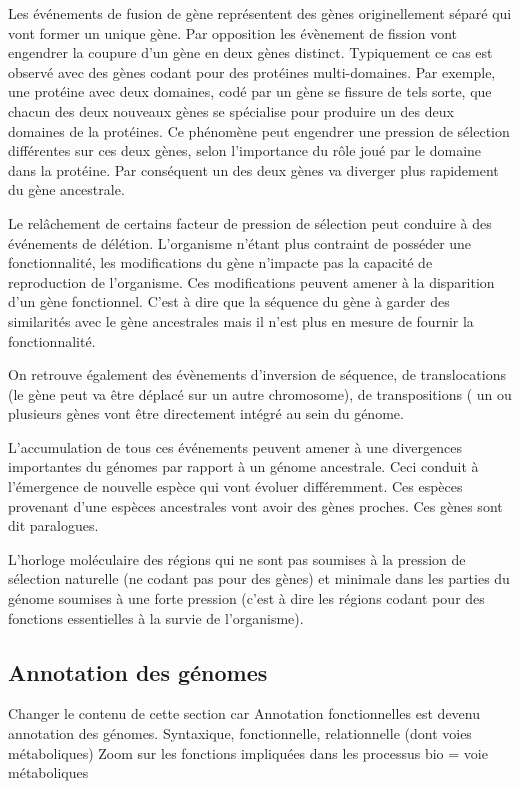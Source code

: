 \begin{refsection}
    Les événements de fusion de gène représentent des gènes originellement séparé qui vont former un unique gène. Par opposition les évènement de fission vont  engendrer la coupure d’un gène en deux gènes distinct. Typiquement ce cas est observé avec des gènes codant pour des protéines multi-domaines. Par exemple, une protéine avec deux domaines, codé par un gène se fissure de tels sorte, que chacun des deux nouveaux gènes se spécialise pour produire un des deux domaines de la protéines. Ce phénomène peut engendrer une pression de sélection différentes sur ces deux gènes, selon l’importance du rôle joué par le domaine dans la protéine. Par conséquent un des deux gènes va diverger plus rapidement du gène ancestrale.
    
    Le relâchement de certains facteur de pression de sélection peut conduire à des événements de délétion. L’organisme n’étant plus contraint de posséder une fonctionnalité, les modifications du gène n’impacte pas la capacité de reproduction de l’organisme. Ces modifications peuvent amener à la disparition d’un gène fonctionnel. C’est à dire que la séquence du gène à garder des similarités avec le gène ancestrales mais il n’est plus en mesure de fournir la fonctionnalité.
    
    On retrouve également des évènements d’inversion de séquence, de translocations (le gène peut va être déplacé sur un autre chromosome), de transpositions ( un ou plusieurs gènes vont être directement intégré au sein du génome.
    
    L’accumulation de tous ces événements peuvent amener  à une divergences importantes du génomes par rapport à un génome ancestrale. Ceci conduit à l’émergence de nouvelle espèce qui vont évoluer différemment. Ces espèces provenant d’une espèces ancestrales vont avoir des gènes proches. Ces gènes sont dit paralogues.
    
    L’horloge moléculaire des régions qui ne sont pas soumises à la pression de sélection naturelle (ne codant pas pour des gènes) et minimale dans les parties du génome soumises à une forte pression (c'est à dire les régions codant pour des fonctions essentielles à la survie de l'organisme).
    
    
    \subsection{Annotation des génomes}
    Changer le contenu de cette section car Annotation fonctionnelles est devenu annotation des génomes.
    Syntaxique, fonctionnelle, relationnelle (dont voies métaboliques) Zoom sur les fonctions impliquées dans les processus bio = voie métaboliques
    

\end{refsection}
